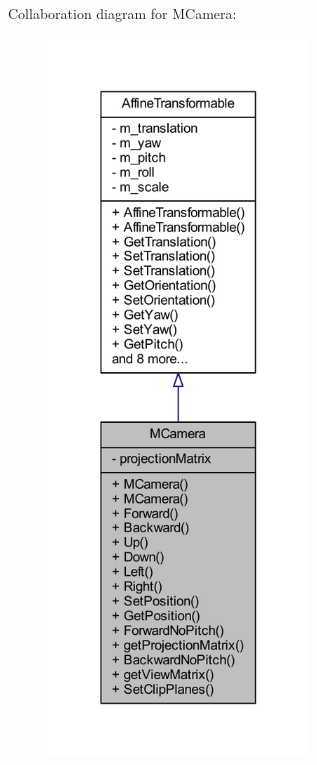 Collaboration diagram for M\+Camera\+:\nopagebreak
\begin{figure}[H]
\begin{center}
\leavevmode
\includegraphics[width=196pt]{class_m_camera__coll__graph}
\end{center}
\end{figure}
